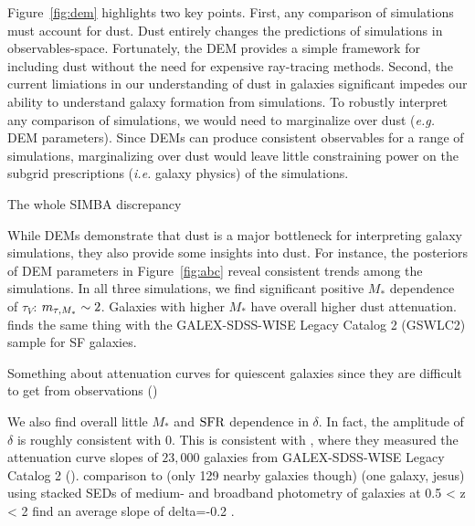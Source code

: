 Figure~\ref{fig:dem} highlights two key points. First, any comparison of
simulations must account for dust. Dust entirely changes the predictions of
simulations in observables-space. Fortunately, the DEM provides a simple framework
for including dust without the need for expensive ray-tracing methods. 
Second, the current limiations in our understanding of dust in galaxies 
significant impedes our ability to understand galaxy formation from simulations. 
To robustly interpret any comparison of simulations, we would need to
marginalize over dust (\emph{e.g.} DEM parameters). Since DEMs can produce
consistent observables for a range of simulations, marginalizing over dust
would leave little constraining power on the subgrid prescriptions (\emph{i.e.}
galaxy physics) of the simulations. 

The whole SIMBA discrepancy

While DEMs demonstrate that dust is a major bottleneck for interpreting galaxy
simulations, they also provide some insights into dust. For instance, the
posteriors of DEM parameters in Figure~\ref{fig:abc} reveal consistent trends
among the simulations. In all three simulations, we find significant positive
$M_*$ dependence of $\tau_V$: $m_{\tau,M_*} \sim 2$. Galaxies with higher $M_*$ have
overall higher dust attenuation. 
\cite{salim2018} finds the same thing with the GALEX-SDSS-WISE Legacy Catalog 2
(GSWLC2) sample for SF galaxies. 


Something about attenuation curves for quiescent galaxies since they are
difficult to get from observations ()

We also find overall little $M_*$ and ${\rm SFR}$ dependence in $\delta$. In
fact, the amplitude of $\delta$ is roughly consistent with 0.  
This is consistent with \cite{salim2020}, where they measured the attenuation
curve slopes of $23,000$ galaxies from GALEX-SDSS-WISE Legacy Catalog 2
(). 
comparison to \cite{leja2017} (only 129 nearby galaxies though) 
\cite{viaene2017} (one galaxy, jesus)  
\cite{kriek2013}  using stacked SEDs of medium- and broadband photometry of
galaxies at 0.5 < z < 2 find an average slope of delta=-0.2 . %

